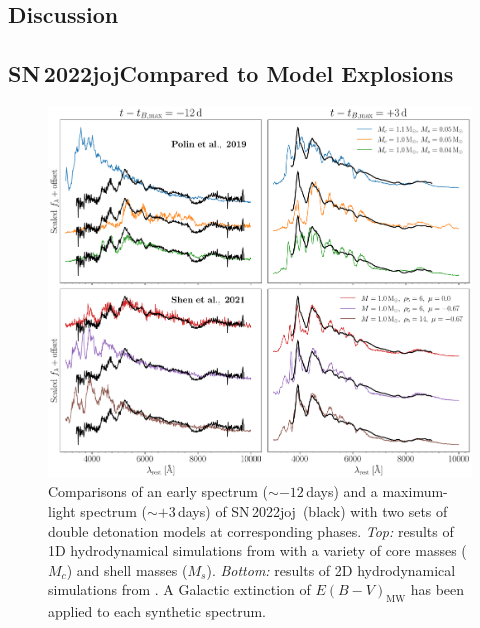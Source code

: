 \documentclass[twocolumn]{aastex631}
\newcommand{\sn}{SN\,2022joj}
\begin{document}
\begin{CJK*}{UTF8}{gbsn}


\section{Discussion} \label{sec:discussion}
\subsection{\sn Compared to Model Explosions} \label{sec:model}

\begin{figure}
    \centering
    \includegraphics[width=\linewidth]{model_comparison_spec.pdf}
    \caption{Comparisons of an early spectrum ($\sim$$-12$\,days) and a maximum-light spectrum ($\sim$$+3$\,days) of \sn\ (black) with two sets of double detonation models at corresponding phases. \textit{Top:} results of 1D hydrodynamical simulations from \citet{polin_observational_2019} with a variety of core masses ($M_c$) and shell masses ($M_s$). \textit{Bottom:} results of 2D hydrodynamical simulations from \citep{Shen_2D_2021}. A Galactic extinction of ${E(B-V)_\mathrm{MW}}$ has been applied to each synthetic spectrum.}
    \label{fig:model_spec}
\end{figure}


\end{CJK*}
\end{document}
